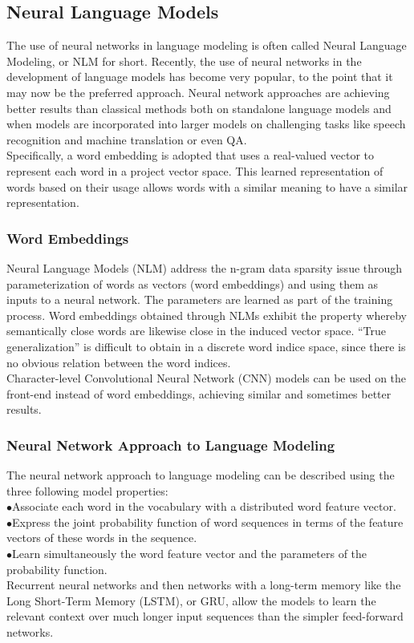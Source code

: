 \subsection{Neural Language Models}
The use of neural networks in language modeling is often called Neural Language Modeling, or NLM for short. Recently, the use of neural networks in the development of language models has become very popular, to the point that it may now be the preferred approach. Neural network approaches are achieving better results than classical methods both on standalone language models and when models are incorporated into larger models on challenging tasks like speech recognition and machine translation or even QA.\\Specifically, a word embedding is adopted that uses a real-valued vector to represent each word in a project vector space.  This learned representation of words based on their usage allows words with a similar meaning to have a similar representation.\subsubsection{Word Embeddings}Neural Language Models (NLM) address the n-gram data sparsity issue through parameterization of words as vectors (word embeddings) and using them as inputs to a neural network. The parameters are learned as part of the training process. Word embeddings obtained through NLMs exhibit the property whereby semantically close words are likewise close in the induced vector space. “True generalization” is difficult to obtain in a discrete word indice space, since there is no obvious relation between the word indices.\\Character-level Convolutional Neural Network (CNN) models can be used on the front-end instead of word embeddings, achieving similar and sometimes better results.\subsubsection{Neural Network Approach to Language Modeling}The neural network approach to language modeling can be described using the three following model properties: \\ \indent$\bullet$\hspace{5pt}Associate each word in the vocabulary with a distributed word feature vector.\\\indent$\bullet$\hspace{5pt}Express the joint probability function of word sequences in terms of the feature vectors of these words in the sequence.\\
\indent$\bullet$\hspace{5pt}Learn simultaneously the word feature vector and the parameters of the probability function.\\
 Recurrent neural networks and then networks with a long-term memory like the Long Short-Term Memory (LSTM), or GRU, allow the models to learn the relevant context over much longer input sequences than the simpler feed-forward networks.
